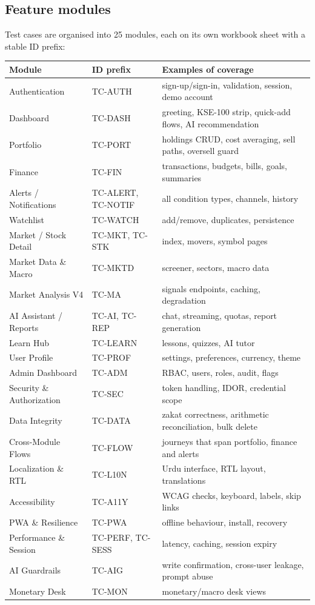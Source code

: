 \documentclass[11pt,a4paper]{article}
\begin{document}
\subsection{Feature modules}
Test cases are organised into 25 modules, each on its own workbook sheet with a
stable ID prefix:

\begin{center}
\small
\begin{tabularx}{\textwidth}{llL}
\toprule
\textbf{Module} & \textbf{ID prefix} & \textbf{Examples of coverage} \\
\midrule
Authentication & TC-AUTH & sign-up/sign-in, validation, session, demo account \\
Dashboard & TC-DASH & greeting, KSE-100 strip, quick-add flows, AI recommendation \\
Portfolio & TC-PORT & holdings CRUD, cost averaging, sell paths, oversell guard \\
Finance & TC-FIN & transactions, budgets, bills, goals, summaries \\
Alerts / Notifications & TC-ALERT, TC-NOTIF & all condition types, channels, history \\
Watchlist & TC-WATCH & add/remove, duplicates, persistence \\
Market / Stock Detail & TC-MKT, TC-STK & index, movers, symbol pages \\
Market Data \& Macro & TC-MKTD & screener, sectors, macro data \\
Market Analysis V4 & TC-MA & signals endpoints, caching, degradation \\
AI Assistant / Reports & TC-AI, TC-REP & chat, streaming, quotas, report generation \\
Learn Hub & TC-LEARN & lessons, quizzes, AI tutor \\
User Profile & TC-PROF & settings, preferences, currency, theme \\
Admin Dashboard & TC-ADM & RBAC, users, roles, audit, flags \\
Security \& Authorization & TC-SEC & token handling, IDOR, credential scope \\
Data Integrity & TC-DATA & zakat correctness, arithmetic reconciliation, bulk delete \\
Cross-Module Flows & TC-FLOW & journeys that span portfolio, finance and alerts \\
Localization \& RTL & TC-L10N & Urdu interface, RTL layout, translations \\
Accessibility & TC-A11Y & WCAG checks, keyboard, labels, skip links \\
PWA \& Resilience & TC-PWA & offline behaviour, install, recovery \\
Performance \& Session & TC-PERF, TC-SESS & latency, caching, session expiry \\
AI Guardrails & TC-AIG & write confirmation, cross-user leakage, prompt abuse \\
Monetary Desk & TC-MON & monetary/macro desk views \\
\bottomrule
\end{tabularx}
\end{center}
\end{document}
